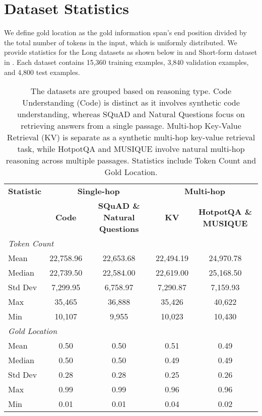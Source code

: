 \section{Dataset Statistics}
\label{app:data}
We define gold location as the gold information span's end position divided by the total number of tokens in the input, which is uniformly distributed. We provide statistics for the Long datasets as shown below in  and Short-form dataset in . Each dataset contains 15,360 training examples, 3,840 validation examples, and 4,800 test examples.

\begin{table}[H]
\centering
\small
\begin{tabular}{lcccc}
\toprule
\textbf{Statistic} & \multicolumn{2}{c}{\textbf{Single-hop}} & \multicolumn{2}{c}{\textbf{Multi-hop}} \\
\cmidrule(lr){2-3} \cmidrule(lr){4-5}
 & \textbf{Code} & \textbf{SQuAD \& Natural Questions} & \textbf{KV} & \textbf{HotpotQA \& MUSIQUE} \\
\midrule
\multicolumn{5}{l}{\textit{Token Count}} \\
Mean & 22,758.96 & 22,653.68 & 22,494.19 & 24,970.78 \\
Median & 22,739.50 & 22,584.00 & 22,619.00 & 25,168.50 \\
Std Dev & 7,299.95 & 6,758.97 & 7,290.87 & 7,159.93 \\
Max & 35,465 & 36,888 & 35,426 & 40,622 \\
Min & 10,107 & 9,955 & 10,023 & 10,430 \\
\midrule
\multicolumn{5}{l}{\textit{Gold Location}} \\
Mean & 0.50 & 0.50 & 0.51 & 0.49 \\
Median & 0.50 & 0.50 & 0.49 & 0.49 \\
Std Dev & 0.28 & 0.28 & 0.25 & 0.26 \\
Max & 0.99 & 0.99 & 0.96 & 0.96 \\
Min & 0.01 & 0.01 & 0.04 & 0.02 \\
\bottomrule
\end{tabular}
\caption{The datasets are grouped based on reasoning type. Code Understanding (Code) is distinct as it involves synthetic code understanding, whereas SQuAD and Natural Questions focus on retrieving answers from a single passage. Multi-hop Key-Value Retrieval (KV) is separate as a synthetic multi-hop key-value retrieval task, while HotpotQA and MUSIQUE involve natural multi-hop reasoning across multiple passages. Statistics include Token Count and Gold Location.}
\label{tab:dataset}
\end{table}

